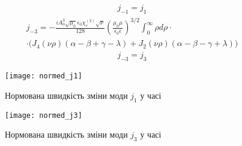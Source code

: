 %
\begin{equation} \begin{aligned}
j_{-1} = j_{1}
\end{aligned} \end{equation}
%
%
\begin{equation} \begin{gathered}
j_{-3} = - \frac{i A_0^3 \sqrt{\mu_0} \epsilon_0 \chi_e^{(3)} \sqrt{\nu}}{128}
\left( \frac{\mu_0 \mu}{\epsilon_0 \epsilon} \right)^{3/2}
\int_0^\infty \rho d \rho \cdot \\ \cdot
\Big( J_4 (\nu \rho) ( \alpha - \beta + \gamma - \lambda) + 
J_2 (\nu \rho) ( \alpha - \beta - \gamma + \lambda) \Big)
\end{gathered} \end{equation}
%
\begin{equation} \begin{aligned}
j_{-3} = j_{3}
\end{aligned} \end{equation}

\begin{figure}[htbp] \begin{center}
\texttt{[image: normed\_j1]}
\caption{Нормована швидкість зміни моди $ j_1 $ у часі} \label{fig:mode1}
\end{center} \end{figure}

\begin{figure}[htbp] \begin{center}
\texttt{[image: normed\_j3]}
\caption{Нормована швидкість зміни моди $ j_3 $ у часі} \label{fig:mode3}
\end{center} \end{figure}


